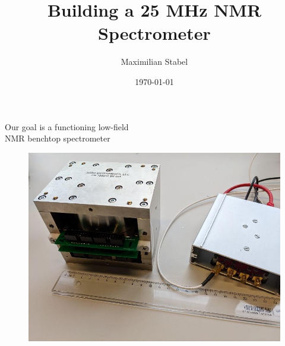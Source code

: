 \documentclass[aspectratio=169]{beamer}
\title{Building a 25 MHz NMR Spectrometer}
\date{\today}
\author{Maximilian Stabel}
\institute{ETH Zürich}
\begin{document}
\maketitle
\begin{frame}{Our goal is a functioning low-field\\NMR benchtop spectrometer}
  \begin{figure}
    \centering
    \includegraphics[width=\textwidth,height=0.8\textheight,keepaspectratio]{./img/magnet.png}
  \end{figure}
\end{frame}
\end{document}
